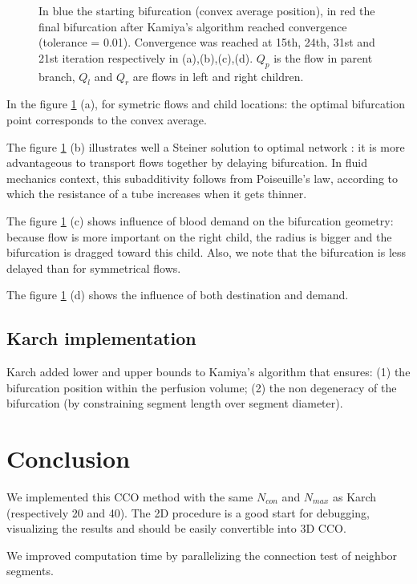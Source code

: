 \documentclass[a4paper, 11pt]{article} %
\begin{document}
\begin{figure}[!h]
\caption{In blue the starting bifurcation (convex average position), in red the final bifurcation after Kamiya's algorithm reached convergence (tolerance = 0.01). Convergence was reached at 15th, 24th, 31st and 21st iteration respectively in (a),(b),(c),(d). $Q_p$ is the flow in parent branch, $Q_l$ and $Q_r$ are flows in left and right children.}
\label{fig:generation}
\end{figure}

In the figure \ref{fig:generation} (a), for symetric flows and child locations: the optimal bifurcation point corresponds to the convex average.

The figure \ref{fig:generation} (b) illustrates well a Steiner solution to optimal network \cite{bernot2009optimal}: it is more advantageous to transport flows together by delaying bifurcation. In fluid mechanics context, this subadditivity follows from Poiseuille's law, according to which the resistance of a tube increases when it gets thinner.

The figure \ref{fig:generation} (c) shows influence of blood demand on the bifurcation geometry: because flow is more important on the right child, the radius is bigger and the bifurcation is dragged toward this child. Also, we note that the bifurcation is less delayed than for symmetrical flows.

The figure \ref{fig:generation} (d) shows the influence of both destination and demand.


\subsection*{Karch implementation}

Karch added lower and upper bounds to Kamiya's algorithm that ensures:
(1) the bifurcation position within the perfusion volume; (2)
the non degeneracy of the bifurcation (by constraining segment length over segment diameter).



\section*{Conclusion}

We implemented this CCO method with the same $N_{con}$ and $N_{max}$ as Karch (respectively 20 and 40). The 2D procedure is a good start for debugging, visualizing the results and should be easily convertible into 3D CCO.


We improved computation time by parallelizing the connection test of neighbor segments.
\end{document}
